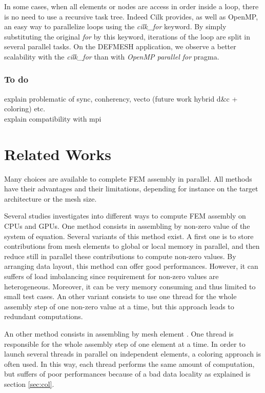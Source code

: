 \documentclass{IOS-Book-Article}
\begin{document}
In some cases, when all elements or nodes are access in order inside a loop, there is no need to use a recursive task tree.
Indeed Cilk provides, as well as OpenMP, an easy way to parallelize loops using the \emph{cilk\_for} keyword.
By simply substituting the original \emph{for} by this keyword, iterations of the loop are split in several parallel tasks.
On the DEFMESH application, we observe a better scalability with the \emph{cilk\_for} than with \emph{OpenMP parallel for} pragma.

\subsubsection{To do}
explain problematic of sync, conherency, vecto (future work hybrid d\&c + coloring) etc.\\
explain compatibility with mpi\\

\section{Related Works}
Many choices are available to complete FEM assembly in parallel.
All methods have their advantages and their limitations, depending for instance on the target architecture or the mesh size.

Several studies \cite{Stanford,CPUGPUasm} investigates into different ways to compute FEM assembly on CPUs and GPUs.
One method consists in assembling by non-zero value of the system of equation. Several variants of this method exist.
A first one is to store contributions from mesh elements to global or local memory in parallel, and then reduce still in parallel these contributions to compute non-zero values.
By arranging data layout, this method can offer good performances. However, it can suffers of load imbalancing since requirement for non-zero values are heterogeneous.
Moreover, it can be very memory consuming and thus limited to small test cases.
An other variant consists to use one thread for the whole assembly step of one non-zero value at a time, but this approach leads to redundant computations.

An other method consists in assembling by mesh element \cite{CUDAfe,CPUfe1,CPUfe2}. One thread is responsible for the whole assembly step of one element at a time.
In order to launch several threads in parallel on independent elements, a coloring approach is often used.
In this way, each thread performs the same amount of computation, but suffers of poor performances because of a bad data locality as explained is section \ref{sec:col}.
\end{document}
